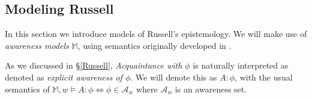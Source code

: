


\subsection{Modeling Russell}\label{mod-russell}

In this section we introduce models of Russell's epistemology.  We
will make use of \emph{awareness models} $\mathbb{M}$, using semantics originally developed in \cite{fagin_belief_1988}.

As we discussed in \S\ref{Russell}, \emph{Acquaintance with $\phi$} is
naturally interpreted as denoted as \emph{explicit awareness of
  $\phi$}.  We will denote this as $A:\phi$, with the usual
semantics of $\mathbb{M},w \models A:\phi \iff \phi \in \mathcal{A}_w$
where $\mathcal{A}_w$ is an awareness set.

